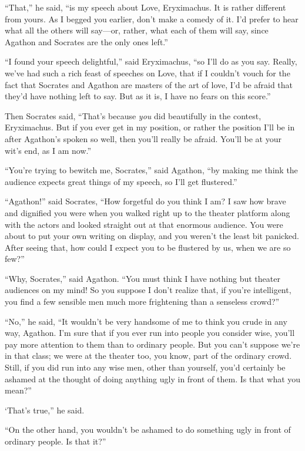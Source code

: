 “That,” he said, “is my speech about Love, Eryximachus. It is rather
different from yours. As I begged you earlier, don't make a comedy of
it.  I'd prefer to hear what all the others will say---or,
rather, what each of them will say, since Agathon and Socrates are the
only ones left.”

“I found your speech delightful,” said Eryximachus, “so I'll do as you
say. Really, we've had such a rich feast of speeches on Love, that if I
couldn't vouch for the fact that Socrates and Agathon are masters of the
art of love, I'd be afraid that they'd have nothing left to say. But as
it is, I have no fears on this score.”

 Then Socrates said, “That's because {\em you} did
beautifully in the contest, Eryximachus. But if you ever get in my
position, or rather the position I'll be in after Agathon's spoken so
well, then you'll really be afraid. You'll be at your wit's end, as I am
now.”

“You're trying to bewitch me, Socrates,” said Agathon, “by making me
think the audience expects great things of my speech, so I'll get
flustered.” 

“Agathon!” said Socrates, “How forgetful do you think I am? I saw how
brave and dignified you were when you walked right up to the theater
platform along with the actors and looked straight out at that enormous
audience. You were about to put your own writing on display, and you
weren't the least bit panicked. After seeing that, how could I expect
you to be flustered by us, when we are so few?”

“Why, Socrates,” said Agathon. “You must think I have nothing but
theater audiences on my mind! So you suppose I don't realize that, if
you're intelligent, you find a few sensible men much more frightening
than a senseless crowd?”

“No,” he said, “It wouldn't be very handsome of me to think you crude
 in any way, Agathon. I'm sure that if you ever run into people
you consider wise, you'll pay more attention to them than to ordinary
people. But you can't suppose we're in that class; we were at the
theater too, you know, part of the ordinary crowd. Still, if you did run
into any wise men, other than yourself, you'd certainly be ashamed at
the thought of doing anything ugly in front of them. Is that what you
mean?”

‘That's true,” he said.

“On the other hand, you wouldn't be ashamed to do something ugly 
in front of ordinary people. Is that it?”

